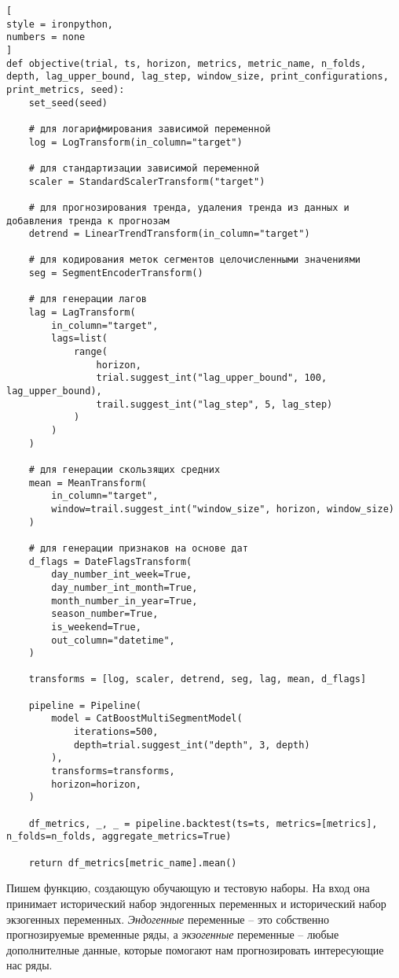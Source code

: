 \documentclass[%
	11pt,
	a4paper,
	utf8,
		]{article}
\begin{document}
\begin{lstlisting}[
style = ironpython,
numbers = none
]
def objective(trial, ts, horizon, metrics, metric_name, n_folds, depth, lag_upper_bound, lag_step, window_size, print_configurations, print_metrics, seed):
    set_seed(seed)
    
    # для логарифмирования зависимой переменной
    log = LogTransform(in_column="target")
    
    # для стандартизации зависимой переменной
    scaler = StandardScalerTransform("target")
    
    # для прогнозирования тренда, удаления тренда из данных и добавления тренда к прогнозам
    detrend = LinearTrendTransform(in_column="target")
    
    # для кодирования меток сегментов целочисленными значениями
    seg = SegmentEncoderTransform()
    
    # для генерации лагов
    lag = LagTransform(
        in_column="target",
        lags=list(
            range(
                horizon,
                trial.suggest_int("lag_upper_bound", 100, lag_upper_bound),
                trail.suggest_int("lag_step", 5, lag_step)
            )
        )
    )
    
    # для генерации скользящих средних
    mean = MeanTransform(
        in_column="target",
        window=trail.suggest_int("window_size", horizon, window_size)
    )
    
    # для генерации признаков на основе дат
    d_flags = DateFlagsTransform(
        day_number_int_week=True,
        day_number_int_month=True,
        month_number_in_year=True,
        season_number=True,
        is_weekend=True,
        out_column="datetime",
    )
    
    transforms = [log, scaler, detrend, seg, lag, mean, d_flags]
    
    pipeline = Pipeline(
        model = CatBoostMultiSegmentModel(
            iterations=500,
            depth=trial.suggest_int("depth", 3, depth)
        ),
        transforms=transforms,
        horizon=horizon,
    )
    
    df_metrics, _, _ = pipeline.backtest(ts=ts, metrics=[metrics], n_folds=n_folds, aggregate_metrics=True)
    
    return df_metrics[metric_name].mean()
\end{lstlisting}

Пишем функцию, создающую обучающую и тестовую наборы. На вход она принимает исторический набор эндогенных переменных и исторический набор экзогенных переменных. \emph{Эндогенные} переменные -- это собственно прогнозируемые временные ряды, а \emph{экзогенные} переменные -- любые дополнителные данные, которые помогают нам прогнозировать интересующие нас ряды.
\end{document}
